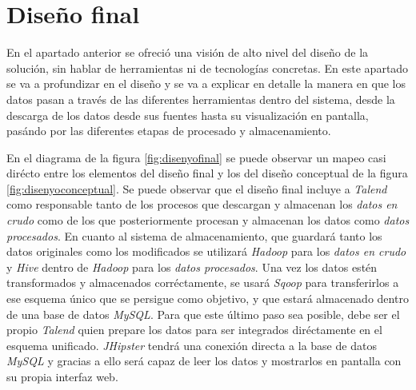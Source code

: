 \section{Diseño final} \label{disenyo.final}
En el apartado anterior se ofreció una visión de alto nivel del diseño de la solución, sin hablar de herramientas ni de tecnologías concretas. En este apartado se va a profundizar en el diseño y se va a explicar en detalle la manera en que los datos pasan a través de las diferentes herramientas dentro del sistema, desde la descarga de los datos desde sus fuentes hasta su visualización en pantalla, pasándo por las diferentes etapas de procesado y almacenamiento. 
\par
En el diagrama de la figura \ref{fig:disenyofinal} se puede observar un mapeo casi dirécto entre los elementos del diseño final y los del diseño conceptual de la figura \ref{fig:disenyoconceptual}. Se puede observar que el diseño final incluye a \textit{Talend} como responsable tanto de los procesos que descargan y almacenan los \textit{datos en crudo} como de los que posteriormente procesan y almacenan los datos como \textit{datos procesados}. En cuanto al sistema de almacenamiento, que guardará tanto los datos originales como los modificados se utilizará \textit{Hadoop} para los \textit{datos en crudo} y \textit{Hive} dentro de \textit{Hadoop} para los \textit{datos procesados}. Una vez los datos estén transformados y almacenados corréctamente, se usará \textit{Sqoop} para transferirlos a ese esquema único que se persigue como objetivo, y que estará almacenado dentro de una base de datos \textit{MySQL}. Para que este último paso sea posible, debe ser el propio \textit{Talend} quien prepare los datos para ser integrados diréctamente en el esquema unificado. \textit{JHipster} tendrá una conexión directa a la base de datos \textit{MySQL} y gracias a ello será capaz de leer los datos y mostrarlos en pantalla con su propia interfaz web. 
